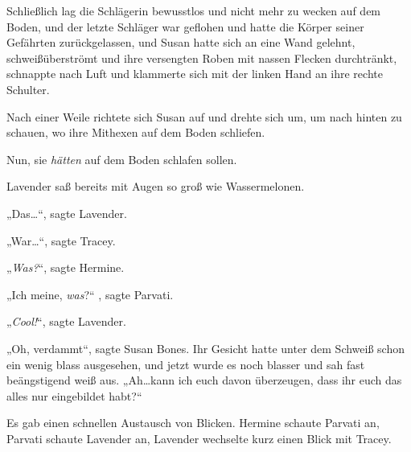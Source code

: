 Schließlich lag die Schlägerin bewusstlos und nicht mehr zu wecken auf dem Boden, und der letzte Schläger war geflohen und hatte die Körper seiner Gefährten zurückgelassen, und Susan hatte sich an eine Wand gelehnt, schweißüberströmt und ihre versengten Roben mit nassen Flecken durchtränkt, schnappte nach Luft und klammerte sich mit der linken Hand an ihre rechte Schulter.

Nach einer Weile richtete sich Susan auf und drehte sich um, um nach hinten zu schauen, wo ihre Mithexen auf dem Boden schliefen.

Nun, sie \emph{hätten} auf dem Boden schlafen sollen.

Lavender saß bereits mit Augen so groß wie Wassermelonen.

„Das…“, sagte Lavender.

„War…“, sagte Tracey.

„\emph{Was?}“, sagte Hermine.

„Ich meine, \emph{was}?“ , sagte Parvati.

„\emph{Cool!}“, sagte Lavender.

„Oh, verdammt“, sagte Susan Bones. Ihr Gesicht hatte unter dem Schweiß schon ein wenig blass ausgesehen, und jetzt wurde es noch blasser und sah fast beängstigend weiß aus. „Ah…kann ich euch davon überzeugen, dass ihr euch das alles nur eingebildet habt?“

Es gab einen schnellen Austausch von Blicken. Hermine schaute Parvati an, Parvati schaute Lavender an, Lavender wechselte kurz einen Blick mit Tracey.

